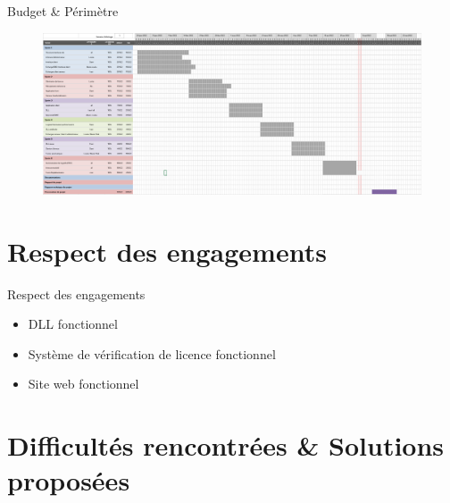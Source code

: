 \documentclass{cubeamer}
\begin{document}
\begin{frame}{Budget \& Périmètre}
    \begin{figure}
        \includegraphics[scale=0.24]{img/Gantt.png}
    \end{figure}
\end{frame}


\section{Respect des engagements}

\begin{frame}{Respect des engagements}
    \begin{itemize}
        \item DLL fonctionnel
        \item Système de vérification de licence fonctionnel
        \item Site web fonctionnel
    \end{itemize}
\end{frame}

\section{Difficultés rencontrées \& Solutions proposées}
\end{document}
